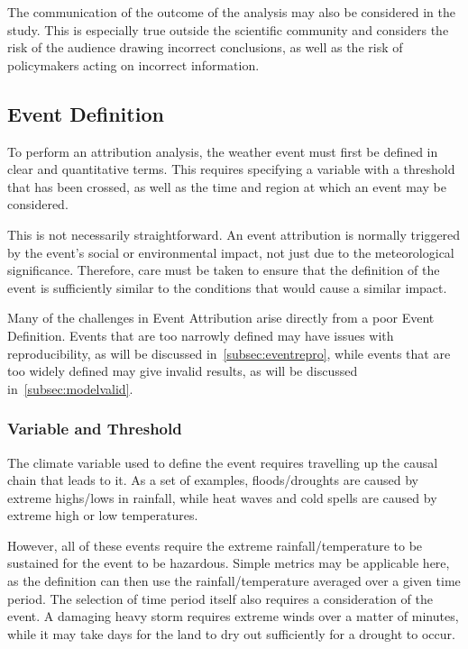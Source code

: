 \documentclass[12pt,a4paper]{report}
\begin{document}
The communication of the outcome of the analysis may also be considered in the study.
This is especially true outside the scientific community
    and considers the risk of the audience drawing incorrect conclusions,
    as well as the risk of policymakers acting on incorrect information.

\subsection{Event Definition}\label{subsec:backeventdef}

To perform an attribution analysis,
    the weather event must first be defined in clear and quantitative terms.
This requires specifying a variable with a threshold that has been crossed,
    as well as the time and region at which an event may be considered.

This is not necessarily straightforward.
An event attribution is normally triggered by the event's social or environmental impact,
     not just due to the meteorological significance.
Therefore, care must be taken to ensure that the definition of the event is sufficiently similar to the conditions that would cause a similar impact.

Many of the challenges in Event Attribution arise directly from a poor Event Definition.
Events that are too narrowly defined may have issues with reproducibility,
    as will be discussed in~\ref{subsec:eventrepro},
    while events that are too widely defined may give invalid results,
    as will be discussed in~\ref{subsec:modelvalid}.

\subsubsection{Variable and Threshold}

The climate variable used to define the event requires travelling up the causal chain that leads to it.
As a set of examples,
    floods/droughts are caused by extreme highs/lows in rainfall,
    while heat waves and cold spells are caused by extreme high or low temperatures.

However,
    all of these events require the extreme rainfall/temperature to be sustained for the event to be hazardous.
Simple metrics may be applicable here,
    as the definition can then use the rainfall/temperature averaged over a given time period.
The selection of time period itself also requires a consideration of the event.
A damaging heavy storm requires extreme winds over a matter of minutes,
    while it may take days for the land to dry out sufficiently for a drought to occur.
\end{document}
